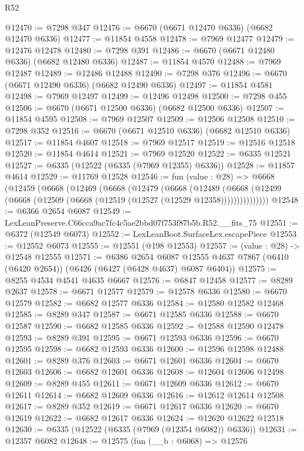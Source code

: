 \begin{lexlean}{R52}
\begin{coremodule}
@12470 := @7298 @347
@12476 := @6670 (@6671 @12470 @6336) (@6682 @12470 @6336)
@12477 := @11854 @4558
@12478 := @7969 @12477
@12479 := @12476 @12478
@12480 := @7298 @391
@12486 := @6670 (@6671 @12480 @6336) (@6682 @12480 @6336)
@12487 := @11854 @4570
@12488 := @7969 @12487
@12489 := @12486 @12488
@12490 := @7298 @376
@12496 := @6670 (@6671 @12490 @6336) (@6682 @12490 @6336)
@12497 := @11854 @4581
@12498 := @7969 @12497
@12499 := @12496 @12498
@12500 := @7298 @455
@12506 := @6670 (@6671 @12500 @6336) (@6682 @12500 @6336)
@12507 := @11854 @4595
@12508 := @7969 @12507
@12509 := @12506 @12508
@12510 := @7298 @352
@12516 := @6670 (@6671 @12510 @6336) (@6682 @12510 @6336)
@12517 := @11854 @4607
@12518 := @7969 @12517
@12519 := @12516 @12518
@12520 := @11854 @4614
@12521 := @7969 @12520
@12522 := @6335 @12521
@12527 := @6335 (@12522 (@6335 (@7969 @12355) @6336))
@12528 := @11857 @4614
@12529 := @11769 @12528
@12546 := fun (value : @28) =>
  @6668
    (@12459
      (@6668
        (@12469
          (@6668
            (@12479
              (@6668
                (@12489
                  (@6668 (@12499 (@6668 (@12509 (@6668 (@12519 (@12527 (@12529 @12358)))))))))))))))
@12548 := @6366 @2654 @6087
@12549 := LexLeanPreserve.C66cca9ac7fc4c5ae2bbd07f753f87b5b.R52.__fits_75
@12551 := @6372 (@12549 @6073)
@12552 := LexLeanBoot.SurfaceLex.escapePiece
@12553 := @12552 @6073
@12555 := @12551 (@198 @12553)
@12557 := (value : @28) -> @12548 @12555
@12571 := @6386
    @2654
    @6087
    @12555
    @4637
    @7867
    (@6410 (@6420 @2654))
    (@6426 (@6427 (@6428 @4637) @6087 @6404))
@12575 := @8255 @4534 @4541 @4635 @6667
@12576 := @6847 @12458
@12577 := @8289 @2637
@12578 := @6671 @12577
@12579 := @12578 @6336
@12580 := @6670 @12579
@12582 := @6682 @12577 @6336
@12584 := @12580 @12582 @12468
@12585 := @8289 @347
@12587 := @6671 @12585 @6336
@12588 := @6670 @12587
@12590 := @6682 @12585 @6336
@12592 := @12588 @12590 @12478
@12593 := @8289 @391
@12595 := @6671 @12593 @6336
@12596 := @6670 @12595
@12598 := @6682 @12593 @6336
@12600 := @12596 @12598 @12488
@12601 := @8289 @376
@12603 := @6671 @12601 @6336
@12604 := @6670 @12603
@12606 := @6682 @12601 @6336
@12608 := @12604 @12606 @12498
@12609 := @8289 @455
@12611 := @6671 @12609 @6336
@12612 := @6670 @12611
@12614 := @6682 @12609 @6336
@12616 := @12612 @12614 @12508
@12617 := @8289 @352
@12619 := @6671 @12617 @6336
@12620 := @6670 @12619
@12622 := @6682 @12617 @6336
@12624 := @12620 @12622 @12518
@12630 := @6335 (@12522 (@6335 (@7969 (@12354 @6082)) @6336))
@12631 := @12357 @6082
@12648 := @12575
    (fun (__b : @6068) =>
    @12576

\end{coremodule}
\end{lexlean}
